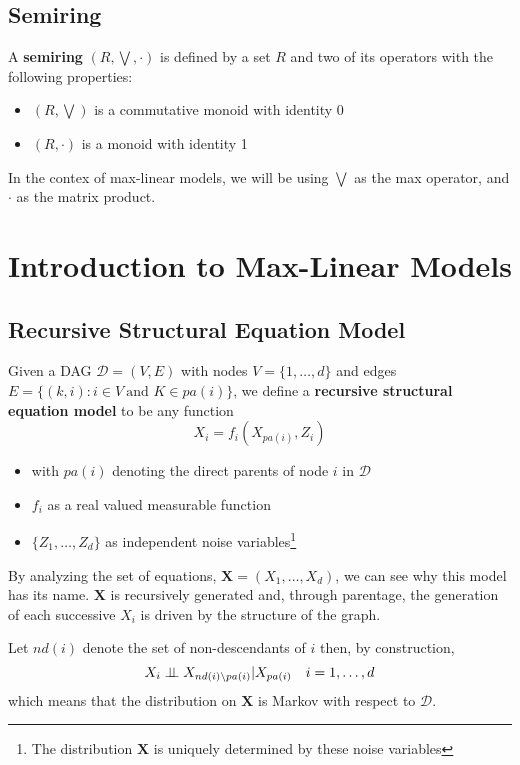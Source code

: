 \documentclass[12pt]{article}
\newcommand{\indep}{\perp \hspace{-.5 em} \perp}
\def\x{\mathbf{X}}
\newcommand{\ds}{\displaystyle}
\theoremstyle{definition}
\begin{document}
\subsection{Semiring}
A \textbf{semiring} $(R,\bigvee,\cdot)$ is defined by a set $R$ and two of its operators with the following properties:
\begin{itemize}
    \item $(R,\bigvee) $ is a commutative monoid with identity 0
    \item $(R,\cdot)$ is a monoid with identity 1
\end{itemize}
In the contex of max-linear models, we will be using $\bigvee$ as the max operator, and $\cdot$ as the matrix product.

\section{Introduction to Max-Linear Models}
\subsection{Recursive Structural Equation Model}
Given a DAG $\mathcal{D}=(V,E)$ with nodes $V=\{1,\hdots, d\}$ and edges $E=\{(k,i):i \in V \ \text{and } K \in pa(i)\}$, we define a \textbf{recursive structural equation model} to be any function $$X_i=f_i(X_{pa(i)},Z_i)$$

\begin{itemize}
    \item with $ \ds pa(i)$ denoting the direct parents of node $i$ in $\mathcal{D}$
    \item $f_i$ as a real valued measurable function
    \item $\ds \{ Z_1, \hdots , Z_d\}$ as independent noise variables\footnote{The distribution $\mathbf{X}$ is uniquely determined by these noise variables}
\end{itemize}
By analyzing the set of equations, $\mathbf{X}= (X_1, \hdots, X_d)$, we can see why this model has its name. $\x$ is recursively generated and, through parentage, the generation of each successive $X_i$ is driven by the structure of the graph.

\noindent Let $nd(i)$ denote the set of non-descendants of $i$ then, by construction, 
$$X_i \indep X_{nd(i)\setminus pa(i)}|X_{pa(i)} \ \ \ i=1,\hdots, d$$
 which means that the distribution on $\mathbf{X}$ is Markov with respect to $\mathcal{D}$.
 
\end{document}
